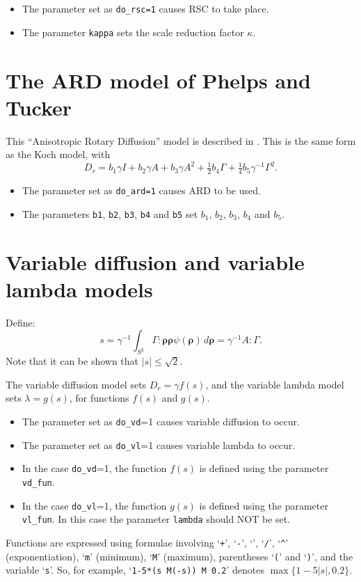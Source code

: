 \documentclass{amsart}
\newcommand{\brho}{{\boldsymbol \rho}}
\begin{document}
\begin{itemize}
\item The parameter set as {\tt do\_rsc=1} causes RSC to take place.
\item The parameter {\tt kappa} sets the scale reduction factor $\kappa$.
\end{itemize}

\section*{The ARD model of Phelps and Tucker}

\noindent
This ``Anisotropic Rotary Diffusion'' model is described in \cite{ard}.  This is the same form as the Koch model, with
$$ D_r = b_1 \gamma I + b_2 \gamma A + b_3 \gamma A^2 + \tfrac12{b_4} \Gamma + \tfrac14{b_5}\gamma^{-1} \Gamma^2 .$$

\begin{itemize}
\item The parameter set as {\tt do\_ard=1} causes ARD to be used.
\item The parameters {\tt b1}, {\tt b2}, {\tt b3}, {\tt b4} and {\tt b5} set $b_1$, $b_2$, $b_3$, $b_4$ and $b_5$.
\end{itemize}

\section*{Variable diffusion and variable lambda models}

\noindent
Define:
$$ s = \gamma^{-1} \int_{S^2} \Gamma:\brho\brho \psi(\brho) \, d\brho = \gamma^{-1} A :\Gamma .$$
Note that it can be shown that $|s| \le \sqrt2$.

The variable diffusion model sets $D_r = \gamma f(s)$, and the variable lambda model sets $\lambda = g(s)$, for functions $f(s)$ and $g(s)$.
\begin{itemize}
\item The parameter set as {\tt do\_vd}=1 causes variable diffusion to occur.
\item The parameter set as {\tt do\_vl}=1 causes variable lambda to occur.
\item In the case {\tt do\_vd}=1, the function $f(s)$ is defined using the parameter {\tt vd\_fun}.
\item In the case {\tt do\_vl}=1, the function $g(s)$ is defined using the parameter {\tt vl\_fun}.  In this case the parameter {\tt lambda} should NOT be set.
\end{itemize}
Functions are expressed using formulae involving `{\tt +}', `{\tt -}', `{\tt *}', `{\tt /}', `{\tt \verb|^|}' (exponentiation), `{\tt m}' (minimum), `{\tt M}' (maximum), parentheses `{\tt(}' and `{\tt)}', and the variable `{\tt s}'.  So, for example, `{\tt 1-5*(s M(-s)) M 0.2}' denotes $\max\{1-5|s|,0.2\}$.
\end{document}
